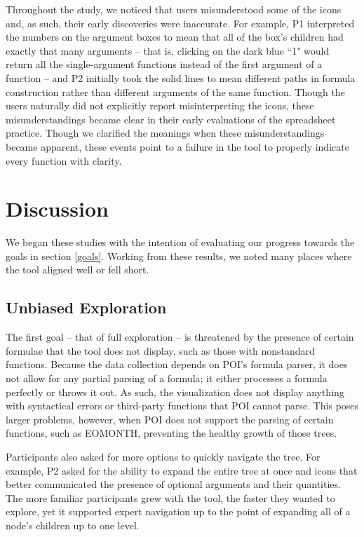 \documentclass[conference]{IEEEtran}
\begin{document}
	Throughout the study, we noticed that users misunderstood some of the icons
	and, as such, their early discoveries were inaccurate. For example, P1
	interpreted the numbers on the argument boxes to mean that all of the box's
	children had exactly that many arguments -- that is, clicking on the dark blue
	``1" would return all the single-argument functions instead of the first
	argument of a function -- and P2 initially took the solid lines to mean
	different paths in formula construction rather than different arguments of the
	same function. Though the users naturally did not explicitly report
	misinterpreting the icons, these misunderstandings became clear in their early
	evaluations of the spreadsheet practice. Though we clarified the meanings when
	these misunderstandings became apparent, these events point to a failure in the
	tool to properly indicate every function with clarity.   \par
	
	
	\section{Discussion} We began these studies with the intention of evaluating
	our progress towards the goals in section \ref{goals}. Working from these
	results, we noted many places where the tool aligned well or fell short.
	
	\subsection{Unbiased Exploration} The first goal -- that of full exploration --
	is threatened by the presence of certain formulae that the tool does not
	display, such as those with nonstandard functions. Because the data collection
	depends on POI's formula parser, it does not allow for any partial parsing of a
	formula; it either processes a formula perfectly or throws it out. As such, the
	visualization does not display anything with syntactical errors or third-party
	functions that POI cannot parse. This poses larger problems, however, when POI
	does not support the parsing of certain functions, such as EOMONTH, preventing
	the healthy growth of those trees. \par
	
	Participants also asked for more options to quickly navigate the tree. For
	example, P2 asked for the ability to expand the entire tree at once and icons
	that better communicated the presence of optional arguments and their
	quantities. The more familiar participants grew with the tool, the faster they
	wanted to explore, yet it supported expert navigation up to the point of
	expanding all of a node's children up to one level. \par
	
\end{document}
